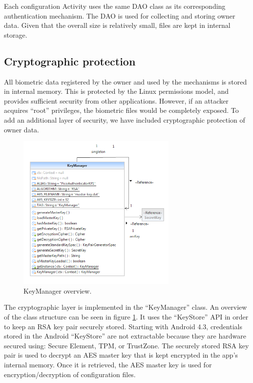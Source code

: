 Each configuration Activity uses the same DAO class as its corresponding authentication mechanism. The DAO is used for collecting and storing owner data. Given that the overall size is relatively small, files are kept in internal storage.

\subsection{Cryptographic protection}
All biometric data registered by the owner and used by the mechanisms is stored in internal memory. This is protected by the Linux permissions model, and provides sufficient security from other applications. However, if an attacker acquires ``root'' privileges, the biometric files would be completely exposed. To add an additional layer of security, we have included cryptographic protection of owner data.

\begin{figure}[h]
    \centering
    \includegraphics[width=0.7\textwidth]{Pictures/keymanager}
    \caption{KeyManager overview.}
    \label{fig:keymanager}
\end{figure}
The cryptographic layer is implemented in the ``KeyManager'' class. An overview of the class structure can be seen in figure \ref{fig:keymanager}. It uses the ``KeyStore'' API in order to keep an RSA key pair securely stored. Starting with Android 4.3, credentials stored in the Android ``KeyStore'' are not extractable because they are hardware secured using: Secure Element, TPM, or TrustZone. The securely stored RSA key pair is used to decrypt an AES master key that is kept encrypted in the app's internal memory. Once it is retrieved, the AES master key is used for encryption/decryption of configuration files.

